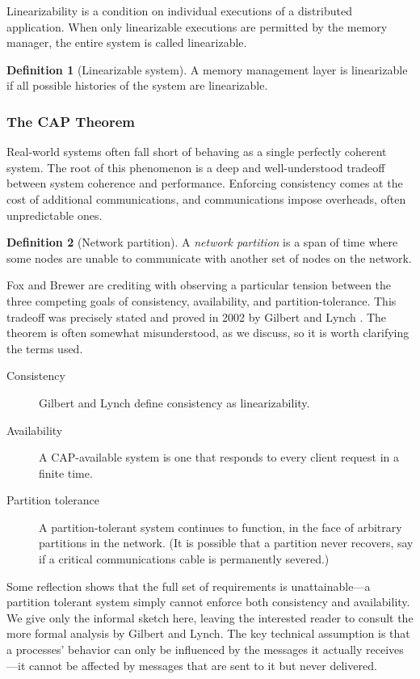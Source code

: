 \documentclass[]             %
{NASA}                       %
\theoremstyle{definition}
\newtheorem{definition}{Definition}[section]
\begin{document}
Linearizability is a condition on individual executions of a
distributed application. When only linearizable executions are
permitted by the memory manager, the entire system is called
linearizable.

\begin{definition}[Linearizable system]
  A memory management layer is linearizable if all possible histories
  of the system are linearizable.
\end{definition}

\subsubsection{The CAP Theorem}
Real-world systems often fall short of behaving as a single perfectly
coherent system. The root of this phenomenon is a deep and
well-understood tradeoff between system coherence and performance.
Enforcing consistency comes at the cost of additional communications,
and communications impose overheads, often unpredictable ones.

\begin{definition}[Network partition]
  A \emph{network partition} is a span of time where some nodes are
  unable to communicate with another set of nodes on the network.
\end{definition}

Fox and Brewer \cite{1999foxbrewer} are crediting with observing a
particular tension between the three competing goals of consistency,
availability, and partition-tolerance. This tradeoff was precisely
stated and proved in 2002 by Gilbert and Lynch
\cite{2002gilbertlynchCAP}.  The theorem is often somewhat
misunderstood, as we discuss, so it is worth clarifying the terms
used.

\begin{description}
\item[Consistency] Gilbert and Lynch define consistency as linearizability.
\item[Availability] A CAP-available system is one that responds to
  every client request in a finite time.
\item[Partition tolerance] A partition-tolerant system continues to
  function, in the face of arbitrary partitions in the network. (It is
  possible that a partition never recovers, say if a critical
  communications cable is permanently severed.)
\end{description}

Some reflection shows that the full set of requirements is
unattainable---a partition tolerant system simply cannot enforce both
consistency and availability. We give only the informal sketch here,
leaving the interested reader to consult the more formal analysis by
Gilbert and Lynch. The key technical assumption is that a processes'
behavior can only be influenced by the messages it actually
receives---it cannot be affected by messages that are sent to it but
never delivered.
\end{document}
